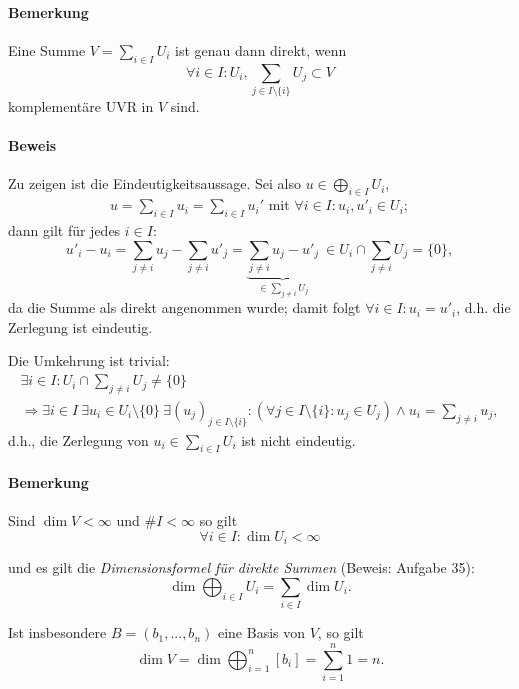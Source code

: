  	\paragraph{Bemerkung}
 		Eine Summe $ V = \sum_{i\in I} U_i $ ist genau dann direkt, wenn
 		\[
 			\forall i\in I: U_i, \sum_{j\in I\setminus\{i\}}U_j \subset V
 		\]
 		komplementäre UVR in $ V $ sind.

 	\paragraph{Beweis}
 		Zu zeigen ist die Eindeutigkeitsaussage. Sei also $ u \in \bigoplus_{i\in I}U_i $,
 		\begin{gather*}
 			u = \sum_{i\in I} u_i = \sum_{i\in I} u_i' \text{ mit } \forall i\in I: u_i,u'_i\in U_i;
 		\end{gather*}
 		dann gilt für jedes $ i\in I$:
 		\[
 			u'_i-u_i = \sum _{j\neq i}u_j-\sum_{j\neq i} u'_j = \underbrace{\sum_{j\neq i}u_j-u'_j}_{\in \sum_{j\neq i}U_j}\ \in U_i\cap \sum_{j\neq i} U_j = \{0\},
 		\]
 		da die Summe als direkt angenommen wurde; damit folgt $ \forall i \in I: u_i = u'_i $, d.h. die Zerlegung ist eindeutig.

 		Die Umkehrung ist trivial:
 		\begin{gather*}
 			\exists i\in I:U_i\cap \sum_{j\neq i} U_j \neq \{0\}\\
 			\Rightarrow \exists i\in I\ \exists u_i\in U_i\setminus\{0\}\ \exists (u_j)_{j\in I\setminus\{i\}}:
 			(\forall j\in I\setminus\{i\}:u_j \in U_j)\land u_i = \sum_{j\neq i} u_j,
 		\end{gather*}
 		d.h., die Zerlegung von $ u_i\in \sum_{i\in I}U_i $ ist nicht eindeutig.

 	\paragraph{Bemerkung}
 		Sind $ \dim V <\infty $ und $ \# I < \infty $ so gilt
 		\begin{equation*}
 			\forall i\in I: \dim U_i < \infty
 		\end{equation*}

 		und es gilt die \emph{Dimensionsformel für direkte Summen} (Beweis: Aufgabe 35):
 		\begin{equation*}
 			\dim \bigoplus_{i\in I}U_i = \sum_{i\in I} \dim U_i.
 		\end{equation*}

 		Ist insbesondere $ B=(b_1,...,b_n) $ eine Basis von $ V $, so gilt
 		\begin{equation*}
 			\dim V = \dim \bigoplus_{i=1}^n [b_i]=\sum_{i=1}^{n}1 = n.
 		\end{equation*}

